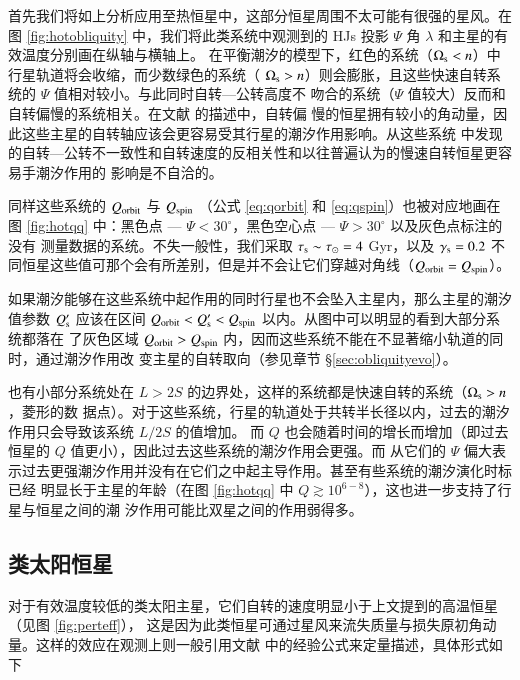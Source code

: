 首先我们将如上分析应用至热恒星中，这部分恒星周围不太可能有很强的星风。在图 \ref{fig:hotobliquity} 
中，我们将此类系统中观测到的 HJs 投影 $\Psi$ 角 $\lambda$ 和主星的有效温度分别画在纵轴与横轴上。
在平衡潮汐的模型下，红色的系统（$\Omega_\mathrm{s} < n$）中行星轨道将会收缩，而少数绿色的系统（
$\Omega_\mathrm{s} > n$）则会膨胀，且这些快速自转系统的 $\Psi$ 值相对较小。与此同时自转---公转高度不
吻合的系统（$\Psi$ 值较大）反而和自转偏慢的系统相关。在文献  的描述中，自转偏
慢的恒星拥有较小的角动量，因此这些主星的自转轴应该会更容易受其行星的潮汐作用影响。从这些系统
中发现的自转---公转不一致性和自转速度的反相关性和以往普遍认为的慢速自转恒星更容易手潮汐作用的
影响是不自洽的\cite{Rogers2013,Li2016}。

同样这些系统的  $Q_\mathrm{orbit}$ 与 $Q_\mathrm{spin}$ （公式 \ref{eq:qorbit} 和 \ref{eq:qspin}）也被对应地画在
图 \ref{fig:hotqq} 中：黑色点 --- $\Psi < 30^\circ$，黑色空心点 --- $\Psi > 30^\circ$ 以及灰色点标注的没有
测量数据的系统。不失一般性，我们采取 $\tau_\mathrm{s} \sim \tau_\odot = 4 $ Gyr，以及 $\gamma_\mathrm{s} = 0.2$
不同恒星这些值可那个会有所差别，但是并不会让它们穿越对角线（$Q_\mathrm{orbit} = Q_\mathrm{spin}$）。

如果潮汐能够在这些系统中起作用的同时行星也不会坠入主星内，那么主星的潮汐值参数 $Q_\mathrm{s}^\prime$
应该在区间 $Q_\mathrm{orbit} < Q_\mathrm{s}^\prime <  Q_\mathrm{spin}$ 以内。从图中可以明显的看到大部分系统都落在
了灰色区域 $Q_\mathrm{orbit} >  Q_\mathrm{spin}$ 内，因而这些系统不能在不显著缩小轨道的同时，通过潮汐作用改
变主星的自转取向（参见章节 \S \ref{sec:obliquityevo}）。

也有小部分系统处在 $L> 2S$ 的边界处，这样的系统都是快速自转的系统（$\Omega_\mathrm{s} > n$，菱形的数
据点）。对于这些系统，行星的轨道处于共转半长径以内，过去的潮汐作用只会导致该系统 $L/2S$ 的值增加。
而 $Q$ 也会随着时间的增长而增加（即过去恒星的 $Q$ 值更小），因此过去这些系统的潮汐作用会更强。而
从它们的 $\Psi$ 偏大表示过去更强潮汐作用并没有在它们之中起主导作用。甚至有些系统的潮汐演化时标已经
明显长于主星的年龄（在图 \ref{fig:hotqq} 中 $Q \gtrsim 10^{6-8}$），这也进一步支持了行星与恒星之间的潮
汐作用可能比双星之间的作用弱得多\cite{Ogilvie2007}。


\subsection{类太阳恒星} \label{sec:coolstar}

对于有效温度较低的类太阳主星，它们自转的速度明显小于上文提到的高温恒星（见图 \ref{fig:perteff}），
这是因为此类恒星可通过星风来流失质量与损失原初角动量。这样的效应在观测上则一般引用文献
 中的经验公式来定量描述，具体形式如下

